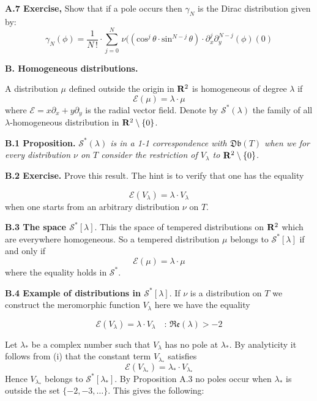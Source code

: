 \noindent
{\bf{A.7 Exercise,}}
Show that if a pole occurs then
$\gamma_N$ is the Dirac distribution given by:
\[ 
\gamma_N(\phi)=\frac{1}{N\,!}\cdot
\sum_{j=0}^{N}\,
\nu((\text{cos}^j\,\theta\cdot \text{sin}^{N-j}\,\theta)\cdot
\partial_x^j\partial_y^{N-j}(\phi)(0)\tag{*}
\]
\newpage







\centerline
{\bf{B. Homogeneous distributions.}}
\medskip


\noindent
A distribution $\mu$ defined outside the origin in
${\bf{R}}^2$ is homogeneous of degree $\lambda$ if
\[ 
\mathcal E(\mu)=\lambda\cdot \mu\tag{*}
\] 
where $\mathcal E=x\partial_x+y\partial_y$ is the radial vector field.
Denote by $\mathcal S^*(\lambda)$ the family of all
$\lambda$-homogeneous distribution in
${\bf{R}}^2\setminus\{0\}$.
\bigskip

\noindent
{\bf{B.1 Proposition.}}
\emph{$\mathcal S^*(\lambda)$ is in a 1-1 correspondence with
$\mathfrak{Db}(T)$ when  we for every distribution $\nu$ on $T$
consider the restriction of $V_\lambda$ to
${\bf{R}}^2\setminus\{0\}$.}
\medskip

\noindent
{\bf{B.2 Exercise.}}
Prove this result. The hint is to verify that
one has the equality

\[ 
\mathcal E(V_\lambda)=\lambda\cdot V_\lambda
\] 
when one  starts from an arbitrary distribution $\nu$ on $T$.
\bigskip


\noindent
{\bf{B.3 The space $\mathcal S^*[\lambda]$}}.
This the space of tempered distributions on
${\bf{R}}^2$ which are everywhere homogeneous. So a tempered
distribution $\mu$ belongs to
$ \mathcal S^*[\lambda]$ 
if and only if
\[ 
\mathcal E(\mu)=\lambda\cdot\mu
\]
where the equality holds in $\mathcal S^*$.
\medskip


\noindent
{\bf{B.4 Example of distributions in
$\mathcal S^*[\lambda]$}}.
If $\nu$ is a distribution on $T$
we construct the meromorphic function $V_\lambda$
here we have the equality

\[
 \mathcal E(V_\lambda)=\lambda\cdot V_\lambda
 \quad\colon\,\mathfrak{Re}(\lambda)>-2\tag{i}
 \]
 
\noindent
Let 
$\lambda_*$ be a complex number such that
$V_\lambda$ has no pole at 
$\lambda_*$. By analyticity it follows from (i) that the constant term
$V_{\lambda_*}$ satisfies
\[
\mathcal E(V_{\lambda_*})=\lambda_*\cdot V_{\lambda_*}\tag{ii}
\]
Hence $V_{\lambda_*}$ belongs to $\mathcal S^*[\lambda_*]$.
By Proposition A.3 no poles occur 
when
$\lambda_*$ is outside the set
$\{-2,-3,\ldots\}$. This gives the following:


